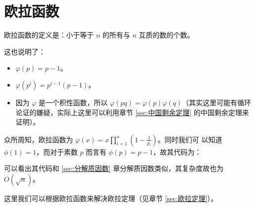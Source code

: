 \section{欧拉函数} \label{sec:求欧拉函数} \label{sec:欧拉函数}
欧拉函数的定义是：小于等于 $n$ 的所有与 $n$ 互质的数的个数。

这也说明了：
\begin{itemize}
    \item $\varphi(p) = p-1$。
    \item $\varphi(p^i) = p^{i-1}(p - 1)$。
    \item 因为 $\varphi$ 是一个积性函数，所以 $\varphi(pq) = \varphi(p)
        \varphi(q)$（其实这里可能有循环论证的嫌疑，实际上这里可以利用章节
        \ref{sec:中国剩余定理} 的中国剩余定理来证明）。
\end{itemize}

众所周知，欧拉函数为 $\varphi(x) = x \prod^{n}_{i=1}(1-\frac{1}{p_i})$。同时我们可
以知道 $\phi(1) = 1$，而对于素数 $p$ 而言有 $\phi(p) = p - 1$，故其代码为：

可以看出其代码和 \ref{sec:分解质因数} 章分解质因数类似，其复杂度故也为 $O(\sqrt
n)$。

这里我们可以根据欧拉函数来解决欧拉定理（见章节 \ref{sec:欧拉定理}）。
